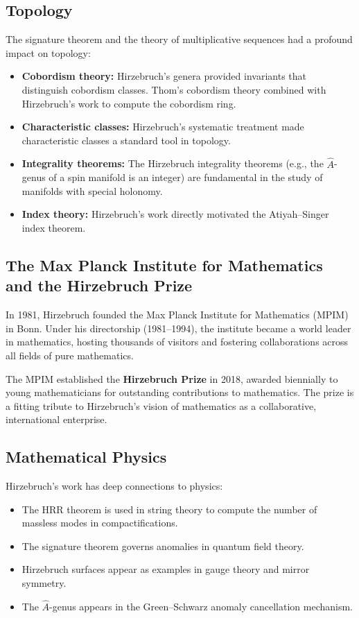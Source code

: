\subsection{Topology}

The signature theorem and the theory of multiplicative sequences had a
profound impact on topology:
\begin{itemize}
    \item \textbf{Cobordism theory:} Hirzebruch's genera provided
    invariants that distinguish cobordism classes. Thom's cobordism
    theory combined with Hirzebruch's work to compute the cobordism
    ring.
    \item \textbf{Characteristic classes:} Hirzebruch's systematic
    treatment made characteristic classes a standard tool in topology.
    \item \textbf{Integrality theorems:} The Hirzebruch integrality
    theorems (e.g., the \(\hat{A}\)-genus of a spin manifold is an
    integer) are fundamental in the study of manifolds with special
    holonomy.
    \item \textbf{Index theory:} Hirzebruch's work directly motivated
    the Atiyah--Singer index theorem.
\end{itemize}

\subsection{The Max Planck Institute for Mathematics and the Hirzebruch Prize}

In 1981, Hirzebruch founded the Max Planck Institute for Mathematics
(MPIM) in Bonn. Under his directorship (1981--1994), the institute
became a world leader in mathematics, hosting thousands of visitors and
fostering collaborations across all fields of pure mathematics.

The MPIM established the \textbf{Hirzebruch Prize} in 2018, awarded
biennially to young mathematicians for outstanding contributions to
mathematics. The prize is a fitting tribute to Hirzebruch's vision of
mathematics as a collaborative, international enterprise.

\subsection{Mathematical Physics}

Hirzebruch's work has deep connections to physics:
\begin{itemize}
    \item The HRR theorem is used in string theory to compute the
    number of massless modes in compactifications.
    \item The signature theorem governs anomalies in quantum field
    theory.
    \item Hirzebruch surfaces appear as examples in gauge theory and
    mirror symmetry.
    \item The \(\hat{A}\)-genus appears in the Green--Schwarz anomaly
    cancellation mechanism.
\end{itemize}

